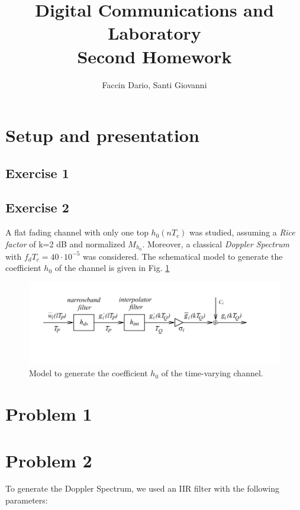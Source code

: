 \documentclass[a4paper, 12pt]{report}
\begin{document}
	
\title{Digital Communications and Laboratory \\ Second Homework}
\author{Faccin Dario, Santi Giovanni}
\date{}
\maketitle

\section*{Setup and presentation}

\subsection*{Exercise 1}

\subsection*{Exercise 2}
A flat fading channel with only one top $h_0(nT_c)$ was studied, assuming a \textit{Rice factor} of k=2 dB and normalized $M_{h_0}$. Moreover, a classical \textit{Doppler Spectrum} with $f_d T_c=40\cdot10^{-5}$ was considered. The schematical model to generate the coefficient $h_0$ of the channel is given in Fig. \ref{Model_2}

\begin{figure}[h]
	\centering
	\includegraphics[width=14cm]{images/Model_2}
	\caption{Model to generate the coefficient $h_0$ of the time-varying channel.}\label{Model_2} 
\end{figure}

\section*{Problem 1}

\section*{Problem 2}
To generate the Doppler Spectrum, we used an IIR filter with the following parameters:
\end{document}
